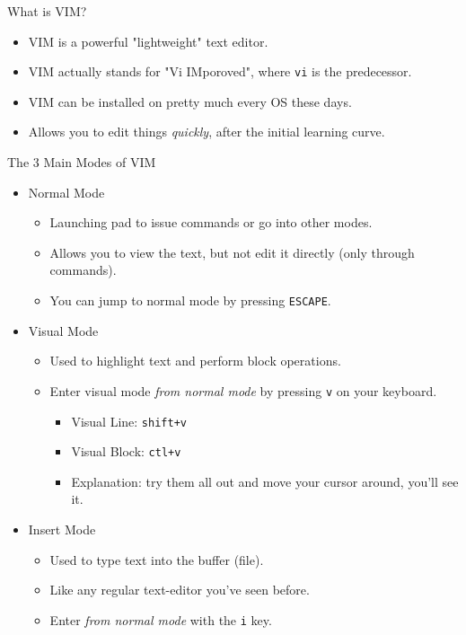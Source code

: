 \begin{frame}[fragile]{What is VIM?}
  \begin{itemize}[<+- | alert@+>]
    \item VIM is a powerful "lightweight" text editor.
    \item VIM actually stands for "Vi IMporoved", where \texttt{vi} is the predecessor.
    \item VIM can be installed on pretty much every OS these days.
    \item Allows you to edit things \emph{quickly}, after the initial learning curve.
  \end{itemize}
\end{frame}

\begin{frame}[fragile]{The 3 Main Modes of VIM}
  \begin{itemize}[<+- | alert@+>]
    \item Normal Mode
    \begin{itemize}[<+- | alert@+>]
      \item Launching pad to issue commands or go into other modes.
      \item Allows you to view the text, but not edit it directly (only through commands).
      \item You can jump to normal mode by pressing \texttt{ESCAPE}.
    \end{itemize}
    \item Visual Mode
    \begin{itemize}[<+- | alert@+>]
      \item Used to highlight text and perform block operations.
      \item Enter visual mode \emph{from normal mode} by pressing \texttt{v} on your keyboard.
      \begin{itemize}[<+- | alert@+>]
        \item Visual Line: \texttt{shift+v}
        \item Visual Block: \texttt{ctl+v}
        \item Explanation: try them all out and move your cursor around, you'll see it.
      \end{itemize}
    \end{itemize}
    \item Insert Mode
    \begin{itemize}[<+- | alert@+>]
      \item Used to type text into the buffer (file).
      \item Like any regular text-editor you've seen before.
      \item Enter \emph{from normal mode} with the \texttt{i} key.
    \end{itemize}
  \end{itemize}
\end{frame}


